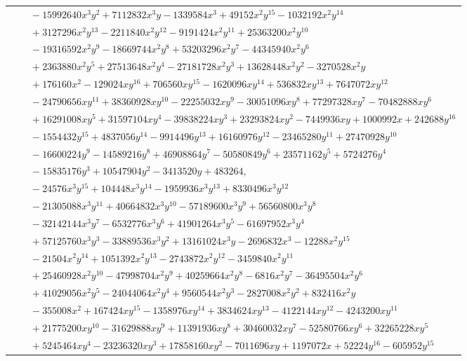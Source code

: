 \documentclass[11pt]{article}
\begin{document}
\begin{longtable}{@{}ll@{}}
 & $\quad -15992640x^{3}y^{2}+7112832x^{3}y-1339584x^{3}+49152x^{2}y^{15}-1032192x^{2}y^{14}$\\
 & $\quad +3127296x^{2}y^{13}-2211840x^{2}y^{12}-9191424x^{2}y^{11}+25363200x^{2}y^{10}$\\
 & $\quad -19316592x^{2}y^{9}-18669744x^{2}y^{8}+53203296x^{2}y^{7}-44345940x^{2}y^{6}$\\
 & $\quad +2363880x^{2}y^{5}+27513648x^{2}y^{4}-27181728x^{2}y^{3}+13628448x^{2}y^{2}-3270528x^{2}y$\\
 & $\quad +176160x^{2}-129024xy^{16}+706560xy^{15}-1620096xy^{14}+536832xy^{13}+7647072xy^{12}$\\
 & $\quad -24790656xy^{11}+38360928xy^{10}-22255032xy^{9}-30051096xy^{8}+77297328xy^{7}-70482888xy^{6}$\\
 & $\quad +16291008xy^{5}+31597104xy^{4}-39838224xy^{3}+23293824xy^{2}-7449936xy+1000992x+242688y^{16}$\\
 & $\quad -1554432y^{15}+4837056y^{14}-9914496y^{13}+16160976y^{12}-23465280y^{11}+27470928y^{10}$\\
 & $\quad -16600224y^{9}-14589216y^{8}+46908864y^{7}-50580849y^{6}+23571162y^{5}+5724276y^{4}$\\
 & $\quad -15835176y^{3}+10547904y^{2}-3413520y+483264,$\\
 & $\quad -24576x^{3}y^{15}+104448x^{3}y^{14}-1959936x^{3}y^{13}+8330496x^{3}y^{12}$\\
 & $\quad -21305088x^{3}y^{11}+40664832x^{3}y^{10}-57189600x^{3}y^{9}+56560800x^{3}y^{8}$\\
 & $\quad -32142144x^{3}y^{7}-6532776x^{3}y^{6}+41901264x^{3}y^{5}-61697952x^{3}y^{4}$\\
 & $\quad +57125760x^{3}y^{3}-33889536x^{3}y^{2}+13161024x^{3}y-2696832x^{3}-12288x^{2}y^{15}$\\
 & $\quad -21504x^{2}y^{14}+1051392x^{2}y^{13}-2743872x^{2}y^{12}-3459840x^{2}y^{11}$\\
 & $\quad +25460928x^{2}y^{10}-47998704x^{2}y^{9}+40259664x^{2}y^{8}-6816x^{2}y^{7}-36495504x^{2}y^{6}$\\
 & $\quad +41029056x^{2}y^{5}-24044064x^{2}y^{4}+9560544x^{2}y^{3}-2827008x^{2}y^{2}+832416x^{2}y$\\
 & $\quad -355008x^{2}+167424xy^{15}-1358976xy^{14}+3834624xy^{13}-4122144xy^{12}-4243200xy^{11}$\\
 & $\quad +21775200xy^{10}-31629888xy^{9}+11391936xy^{8}+30460032xy^{7}-52580766xy^{6}+32265228xy^{5}$\\
 & $\quad +5245464xy^{4}-23236320xy^{3}+17858160xy^{2}-7011696xy+1197072x+52224y^{16}-605952y^{15}$\\

\end{longtable}
\end{document}
